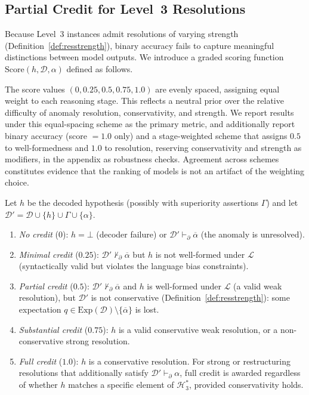 \documentclass{article}
\theoremstyle{definition}
\newcommand{\D}{\mathcal{D}}
\newcommand{\Rgold}{\mathcal{H}^{*}_3}
\newcommand{\La}{\mathcal{L}}
\newcommand{\Exp}{\mathrm{Exp}}
\newcommand{\pPartial}{\vdash_{\partial}}
\newcommand{\comp}[1]{\overline{#1}}
\begin{document}
\subsection{Partial Credit for Level~3 Resolutions}\label{subsec:partial_credit}

Because Level~3 instances admit resolutions of varying strength (Definition~\ref{def:resstrength}), binary accuracy fails to capture meaningful distinctions between model outputs. We introduce a graded scoring function $\mathrm{Score}(h, \D, \alpha)$ defined as follows.

The score values $(0, 0.25, 0.5, 0.75, 1.0)$ are evenly spaced, assigning equal weight to each reasoning stage. This reflects a neutral prior over the relative difficulty of anomaly resolution, conservativity, and strength. We report results under this equal-spacing scheme as the primary metric, and additionally report binary accuracy (score $= 1.0$ only) and a stage-weighted scheme that assigns $0.5$ to well-formedness and $1.0$ to resolution, reserving conservativity and strength as modifiers, in the appendix as robustness checks. Agreement across schemes constitutes evidence that the ranking of models is not an artifact of the weighting choice.

Let $h$ be the decoded hypothesis (possibly with superiority assertions $\Gamma$) and let $\D' = \D \cup \{h\} \cup \Gamma \cup \{\alpha\}$.

\begin{enumerate}[label=(\roman*),nosep]
    \item \textit{No credit} (0): $h = \bot$ (decoder failure) or $\D' \pPartial \comp{\alpha}$ (the anomaly is unresolved).
    \item \textit{Minimal credit} ($0.25$): $\D' \not\pPartial \comp{\alpha}$ but $h$ is not well-formed under $\La$ (syntactically valid but violates the language bias constraints).
    \item \textit{Partial credit} ($0.5$): $\D' \not\pPartial \comp{\alpha}$ and $h$ is well-formed under $\La$ (a valid weak resolution), but $\D'$ is not conservative (Definition~\ref{def:resstrength}): some expectation $q \in \Exp(\D) \setminus \{\comp{\alpha}\}$ is lost.
    \item \textit{Substantial credit} ($0.75$): $h$ is a valid conservative weak resolution, or a non-conservative strong resolution.
    \item \textit{Full credit} ($1.0$): $h$ is a conservative resolution. For strong or restructuring resolutions that additionally satisfy $\D' \pPartial \alpha$, full credit is awarded regardless of whether $h$ matches a specific element of $\Rgold$, provided conservativity holds.
\end{enumerate}
\end{document}
